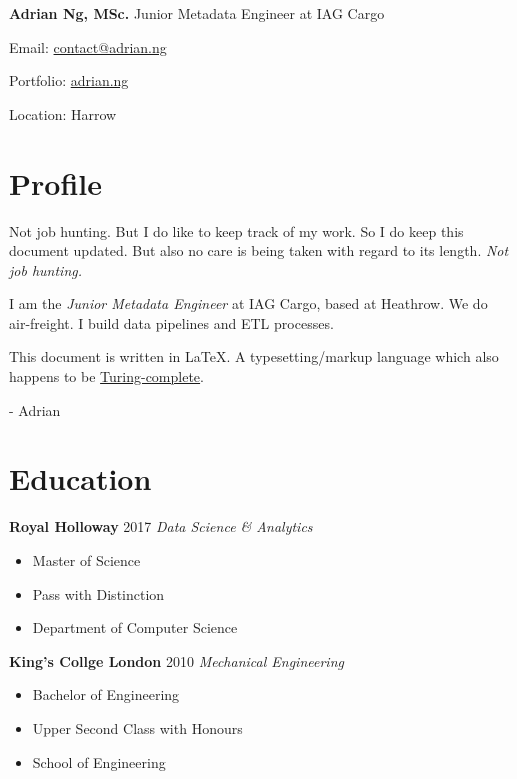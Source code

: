 \documentclass[letterpaper,11pt]{article}
\begin{document}
\noindent
\Large
\textbf{Adrian Ng, MSc.}
\newline
\small
Junior Metadata Engineer at IAG Cargo
\newline
\begin{description*}
	\item[Email:] \href{mailto:contact@adrian.ng}{contact@adrian.ng}
	\item[Portfolio:] \href{https://adrian.ng}{adrian.ng}
	\item[Location:] Harrow
\end{description*}
\hfill
\vspace{0.25cm}
\noindent
\begin{minipage}[t]{0.5\linewidth}
	\section{Profile}
	Not job hunting. But I do like to keep track of my work. So I do keep this document updated. But also no care is being taken with regard to its length. \textit{Not job hunting.}
	\par\quad

	I am the \textit{Junior Metadata Engineer} at IAG Cargo, based at Heathrow. We do air-freight. I build data pipelines and ETL processes.
	\par\quad

	This document is written in \LaTeX. A typesetting/markup language which also happens to be \href{https://www.overleaf.com/learn/latex/Articles/LaTeX_is_More_Powerful_than_you_Think_-_Computing_the_Fibonacci_Numbers_and_Turing_Completeness}{Turing-complete}.
	\par\quad

	- Adrian
\end{minipage}
\hspace{0.2cm}
\begin{minipage}[t]{0.3\linewidth}
	\section{Education}
	\textbf{Royal Holloway} \hfill 2017
	\newline
	\textit{Data Science \& Analytics}
	\begin{itemize}[leftmargin=*, itemsep=0.1em]
		\item	Master of Science
		\item	Pass with Distinction
		\item 	Department of Computer Science
	\end{itemize}
	\vspace{0.15cm}
	\textbf{King's Collge London} \hfill 2010
	\newline
	\textit{Mechanical Engineering}
	\begin{itemize}[leftmargin=*, itemsep=0.1em]
		\item Bachelor of Engineering
		\item Upper Second Class with Honours
		\item School of Engineering
	\end{itemize}
\end{minipage}
\end{document}

